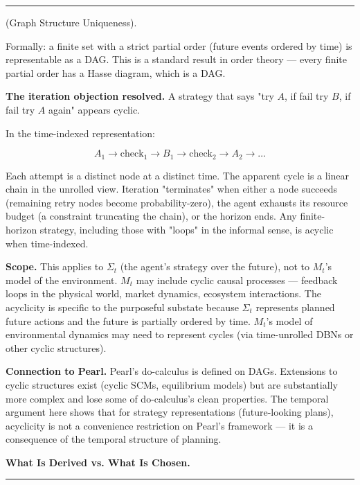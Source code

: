 \documentclass[11pt,oneside]{article}
\newcounter{claim}[section]
\renewcommand{\theclaim}{\thesection.\arabic{claim}}
\newenvironment{segment}[2]{%
  \refstepcounter{claim}%
  \bigskip\noindent\hrule\smallskip
  \noindent{\bfseries #1~\theclaim}\enskip(#2).\par\smallskip
  \noindent\ignorespaces
}{%
  \par\smallskip\noindent\hrule\bigskip
}
\newenvironment{derivation}[1][]{\begin{segment}{Derivation}{#1}}{\end{segment}}
\begin{document}
\begin{derivation}[Graph Structure Uniqueness]
Formally: a finite set with a strict partial order (future events ordered by time) is representable as a DAG. This is a standard result in order theory — every finite partial order has a Hasse diagram, which is a DAG.

\textbf{The iteration objection resolved.} A strategy that says "try $A$, if fail try $B$, if fail try $A$ again" appears cyclic.

In the time-indexed representation:

$$A_1 \to \text{check}_1 \to B_1 \to \text{check}_2 \to A_2 \to \ldots$$

Each attempt is a distinct node at a distinct time. The apparent cycle is a linear chain in the unrolled view. Iteration "terminates" when either a node succeeds (remaining retry nodes become probability-zero), the agent exhausts its resource budget (a constraint truncating the chain), or the horizon ends. Any finite-horizon strategy, including those with "loops" in the informal sense, is acyclic when time-indexed.

\textbf{Scope.} This applies to $\Sigma_t$ (the agent's strategy over the future), not to $M_t$'s model of the environment. $M_t$ may include cyclic causal processes — feedback loops in the physical world, market dynamics, ecosystem interactions. The acyclicity is specific to the purposeful substate because $\Sigma_t$ represents planned future actions and the future is partially ordered by time. $M_t$'s model of environmental dynamics may need to represent cycles (via time-unrolled DBNs or other cyclic structures).

\textbf{Connection to Pearl.} Pearl's do-calculus is defined on DAGs. Extensions to cyclic structures exist (cyclic SCMs, equilibrium models) but are substantially more complex and lose some of do-calculus's clean properties. The temporal argument here shows that for strategy representations (future-looking plans), acyclicity is not a convenience restriction on Pearl's framework — it is a consequence of the temporal structure of planning.


\medskip\noindent\textbf{What Is Derived vs. What Is Chosen.}



\end{derivation}
\end{document}
